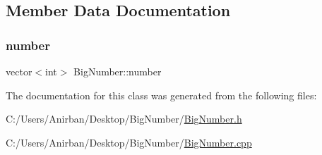\subsection{Member Data Documentation}
\mbox{\label{class_big_number_aefe6af3de273c7e77d02f08f9f6067d0}} 
\subsubsection{\texorpdfstring{number}{number}}
{\footnotesize\ttfamily vector$<$int$>$ Big\+Number\+::number\hspace{0.3cm}{\ttfamily [private]}}



The documentation for this class was generated from the following files\+:\begin{DoxyCompactItemize}
\item 
C\+:/\+Users/\+Anirban/\+Desktop/\+Big\+Number/\mbox{\hyperlink{_big_number_8h}{Big\+Number.\+h}}\item 
C\+:/\+Users/\+Anirban/\+Desktop/\+Big\+Number/\mbox{\hyperlink{_big_number_8cpp}{Big\+Number.\+cpp}}\end{DoxyCompactItemize}
